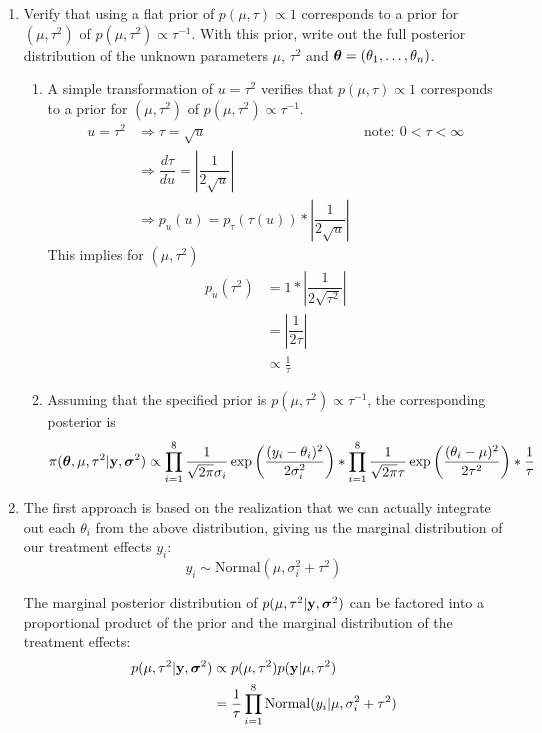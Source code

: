 \documentclass[12pt]{article}
\def\y{\mathbf{y}}
\newcommand{\si}{\mbox{\boldmath $\sigma$}}
\newcommand{\bth}{\mbox{\boldmath $\theta$}}
\begin{document}
\begin{enumerate}
	{\leftmargin=1em}
	
	\item Verify that using a flat prior of $p(\mu,\tau)\propto 1$ corresponds to a prior for $(\mu,\tau^2)$ of $p(\mu,\tau^2) \propto \tau^{-1}$. With this prior, write out the full posterior distribution of the unknown parameters $\mu$, $\tau^2$ and $\bth=(\theta_1,\ldots,\theta_n)$. 
	\begin{enumerate}
		\item A simple transformation of $u=\tau^2$ verifies that $p(\mu,\tau)\propto 1$ corresponds to a prior for $(\mu,\tau^2)$ of $p(\mu,\tau^2) \propto \tau^{-1}$. 
		\begin{align*}
			u = \tau^2 &\Rightarrow \tau=\sqrt{u} &  \mathrm{note: } \ 0<\tau<\infty \\
			& \Rightarrow \dfrac{d\tau}{d u} = |\dfrac{1}{2 \sqrt{u}}| \\
			& \Rightarrow p_u (u) = p_\tau (\tau(u)) * |\dfrac{1}{2 \sqrt{u}}| \ 
		\end{align*}
		This implies for $(\mu,\tau^2)$ 
		\begin{align*}
			p_u (\tau^2) & = 1 * |\dfrac{1}{2 \sqrt{\tau^2}}| \\
			& = |\dfrac{1}{2 \tau } | \\
			& \propto \frac{1}{\tau} 
		\end{align*}
		
		\item Assuming that the specified prior is $p(\mu,\tau^2) \propto \tau^{-1}$, the corresponding posterior is
		\[
			\pi(\bth, \mu, \tau^2 | \mathbf{y}, \si^2) \propto \prod_{i=1}^8  \frac{1}{\sqrt{2\pi} \sigma_{i}} \exp \left( \frac{(y_i - \theta_i)^2}{2\sigma_{i}^2} \right) 
			* \prod_{i=1}^8 \frac{1}{\sqrt{2\pi} \tau} \exp\left(\frac{(\theta_i - \mu)^2}{2\tau^2} \right) * \frac{1}{\tau} 
		\]
	\end{enumerate}


	\item The first approach is based on the realization that we can actually integrate out each $\theta_i$ from the above distribution, giving us the marginal distribution of our treatment effects $y_i$: $$ y_i \sim \mbox{Normal}(\mu,\sigma^2_i+\tau^2) $$ 
	
	The marginal posterior distribution of $p(\mu,\tau^2|\y,\si^2)$ can be factored into a proportional product of the prior and the marginal distribution of the treatment effects:
		\begin{align}
			p(\mu,\tau^2|\y, \si^2) & \propto p(\mu,\tau^2) p(\y | \mu,\tau^2) \nonumber\\
			& = \frac{1}{\tau} \prod_{i=1}^8 \mbox{Normal}(y_i | \mu, \sigma_{i}^2 + \tau^2)
		\end{align}
	

\end{enumerate}
\end{document}
